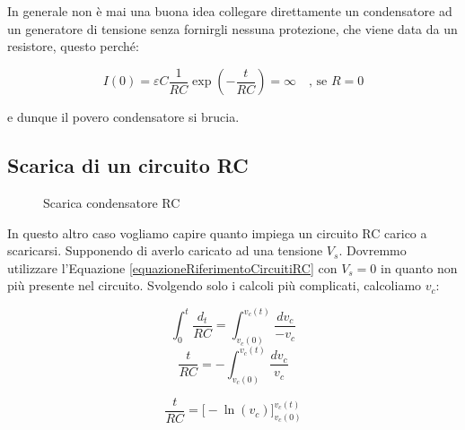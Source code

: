 In generale non è mai una buona idea collegare direttamente un condensatore ad un generatore di tensione senza fornirgli nessuna protezione, che viene data da un resistore, questo perché:

\begin{equation}
    I(0) = \varepsilon C\frac{1}{RC} \exp(-\frac{t}{RC}) = \infty \quad\text{, se $R = 0$}
\end{equation}

e dunque il povero condensatore si brucia. %

\subsection{Scarica di un circuito RC}

\begin{figure}[H]
    \centering
    \caption{Scarica condensatore RC}
    \label{fig:SscaricaCondRC}
\end{figure}

In questo altro caso vogliamo capire quanto impiega un circuito RC carico a scaricarsi.
Supponendo di averlo caricato ad una tensione $V_s$. Dovremmo utilizzare l'Equazione \ref{equazioneRiferimentoCircuitiRC}  con $V_s = 0$ in quanto non più presente nel circuito. Svolgendo solo i calcoli più complicati, calcoliamo $v_c$: 

\begin{equation*}
    \int_0^t \frac{d_t}{RC}= \int_{v_c(0)}^{v_c(t)} \frac{dv_c}{- v_c}
\end{equation*}
\begin{equation*}
    \frac{t}{RC}= -\int_{v_c(0)}^{v_c(t)} \frac{dv_c}{v_c}
\end{equation*}

\begin{equation*}
    \frac{t}{RC} = \Big[-\ln(v_c)\Big]_{v_c(0)}^{v_c(t)}
\end{equation*}


